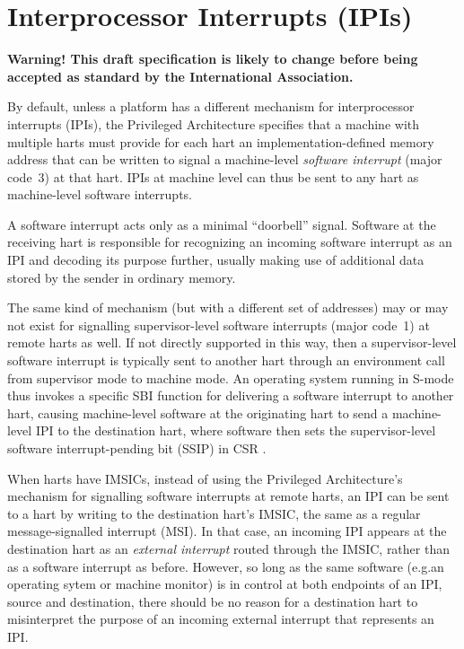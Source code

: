 
\chapter{Interprocessor Interrupts (IPIs)}
\label{ch:IPIs}

\textbf{%
Warning!
This draft specification is likely to change before being accepted as
standard by the {\RISCV} International Association.%
}
\bigskip

By default, unless a platform has a different mechanism for
interprocessor interrupts (IPIs), the {\RISCV} Privileged Architecture
specifies that a machine with multiple harts must provide for each hart
an implementation-defined memory address that can be written to signal
a machine-level \emph{software interrupt} (major code~3) at that hart.
IPIs at machine level can thus be sent to any hart as machine-level
software interrupts.

\begin{commentary}
A {\RISCV} software interrupt acts only as a minimal ``doorbell''
signal.
Software at the receiving hart is responsible for recognizing an
incoming software interrupt as an IPI and decoding its purpose further,
usually making use of additional data stored by the sender in ordinary
memory.
\end{commentary}

The same kind of mechanism (but with a different set of addresses) may
or may not exist for signalling supervisor-level software interrupts
(major code~1) at remote harts as well.
If not directly supported in this way, then a supervisor-level software
interrupt is typically sent to another hart through an environment call
from supervisor mode to machine mode.
An operating system running in \mbox{S-mode} thus invokes a specific
SBI function for delivering a software interrupt to another hart,
causing machine-level software at the originating hart to send a
machine-level IPI to the destination hart, where software then sets the
supervisor-level software interrupt-pending bit (SSIP) in CSR .

When harts have IMSICs, instead of using the Privileged Architecture's
mechanism for signalling software interrupts at remote harts, an IPI
can be sent to a hart by writing to the destination hart's IMSIC, the
same as a regular message-signalled interrupt (MSI)\@.
In that case, an incoming IPI appears at the destination hart as an
\emph{external interrupt} routed through the IMSIC, rather than as a
software interrupt as before.
However, so long as the same software (e.g.\@ an operating sytem or
machine monitor) is in control at both endpoints of an IPI, source
and destination, there should be no reason for a destination hart
to misinterpret the purpose of an incoming external interrupt that
represents an IPI.

